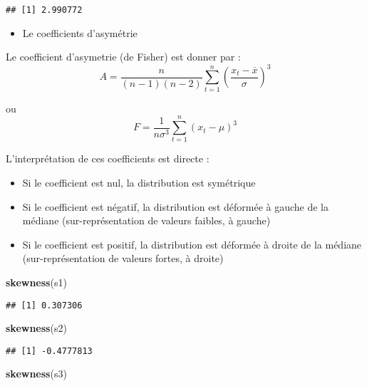 \documentclass[
]{book}
\newenvironment{Shaded}{\begin{snugshade}}{\end{snugshade}}
\newcommand{\FunctionTok}[1]{\textcolor[rgb]{0.13,0.29,0.53}{\textbf{#1}}}
\newcommand{\NormalTok}[1]{#1}
\providecommand{\tightlist}{%
  \setlength{\itemsep}{0pt}\setlength{\parskip}{0pt}}
\theoremstyle{definition}
\theoremstyle{definition}
\theoremstyle{definition}
\theoremstyle{definition}
\theoremstyle{remark}
\begin{document}
\begin{verbatim}
## [1] 2.990772
\end{verbatim}

\begin{itemize}
\tightlist
\item
  Le coefficients d'asymétrie
\end{itemize}

Le coefficient d'asymetrie (de Fisher) est donner par :
\[A = \frac{n}{(n-1)(n-2)} \sum_{t=1}^n \left( \frac{x_t - \overline{x}}{\sigma} \right) ^3\]

ou
\[F = \frac{1}{n\sigma^3} \sum_{t=1}^n (x_t - \mu)^3\]

L'interprétation de ces coefficients est directe :

\begin{itemize}
\tightlist
\item
  Si le coefficient est nul, la distribution est symétrique
\item
  Si le coefficient est négatif, la distribution est déformée à gauche de la médiane (sur-représentation de valeurs faibles, à gauche)
\item
  Si le coefficient est positif, la distribution est déformée à droite de la médiane (sur-représentation de valeurs fortes, à droite)
\end{itemize}

\begin{Shaded}
\begin{Highlighting}[]
\FunctionTok{skewness}\NormalTok{(s1)}
\end{Highlighting}
\end{Shaded}

\begin{verbatim}
## [1] 0.307306
\end{verbatim}

\begin{Shaded}
\begin{Highlighting}[]
\FunctionTok{skewness}\NormalTok{(s2)}
\end{Highlighting}
\end{Shaded}

\begin{verbatim}
## [1] -0.4777813
\end{verbatim}

\begin{Shaded}
\begin{Highlighting}[]
\FunctionTok{skewness}\NormalTok{(s3)}
\end{Highlighting}
\end{Shaded}
\end{document}
